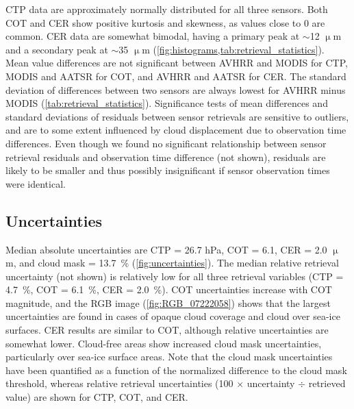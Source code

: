 CTP data are approximately normally distributed for all three sensors. Both COT and CER show positive kurtosis and skewness, as values close to 0 are common. CER data are somewhat bimodal, having a primary peak at $\sim$12 $\upmu$m and a secondary peak at $\sim$35 $\upmu$m (\cref{fig:histograms,tab:retrieval_statistics}). Mean value differences are not significant between AVHRR and MODIS for CTP, MODIS and AATSR for COT, and AVHRR and AATSR for CER. The standard deviation of differences between two sensors are always lowest for AVHRR minus MODIS (\cref{tab:retrieval_statistics}). Significance tests of mean differences and standard deviations of residuals between sensor retrievals are sensitive to outliers, and are to some extent influenced by cloud displacement due to observation time differences. Even though we found no significant relationship between sensor retrieval residuals and observation time difference (not shown), residuals are likely to be smaller and thus possibly insignificant if sensor observation times were identical.

\subsection{Uncertainties}

Median absolute uncertainties are CTP = 26.7 hPa, COT = 6.1, CER = 2.0 $\upmu$m, and cloud mask = 13.7~\% (\cref{fig:uncertainties}). The median relative retrieval uncertainty (not shown) is relatively low for all three retrieval variables (CTP = 4.7~\%, COT = 6.1~\%, CER = 2.0~\%). COT uncertainties increase with COT magnitude, and the RGB image (\cref{fig:RGB_07222058}) shows that the largest uncertainties are found in cases of opaque cloud coverage and cloud over sea-ice surfaces. CER results are similar to COT, although relative uncertainties are somewhat lower. Cloud-free areas show increased cloud mask uncertainties, particularly over sea-ice surface areas. Note that the cloud mask uncertainties have been quantified as a function of the normalized difference to the cloud mask threshold, whereas relative retrieval uncertainties (100 $\times$ uncertainty $\div$ retrieved value) are shown for CTP, COT, and CER. 

